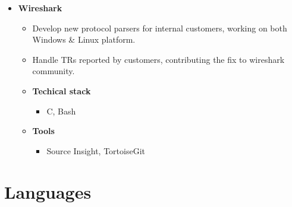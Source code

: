 \documentclass[10pt,a4paper,sans]{moderncv}        %
\begin{document}
{\begin{itemize}
\begin{itemize}
        \begin{itemize}
        \item Eclipse, Vim
        \end{itemize}
    \end{itemize}
\item \textbf{Wireshark}
    \begin{itemize}
    \item Develop new protocol parsers for internal customers, working on both Windows \& Linux platform.
    \item Handle TRs reported by customers, contributing the fix to wireshark community.
    \item \textbf{Techical stack}
        \begin{itemize}
        \item C, Bash
        \end{itemize}
    \item \textbf{Tools}
        \begin{itemize}
        \item Source Insight, TortoiseGit
        \end{itemize}
    \end{itemize}
\end{itemize}}

\section{Languages}

\clearpage
\end{document}
